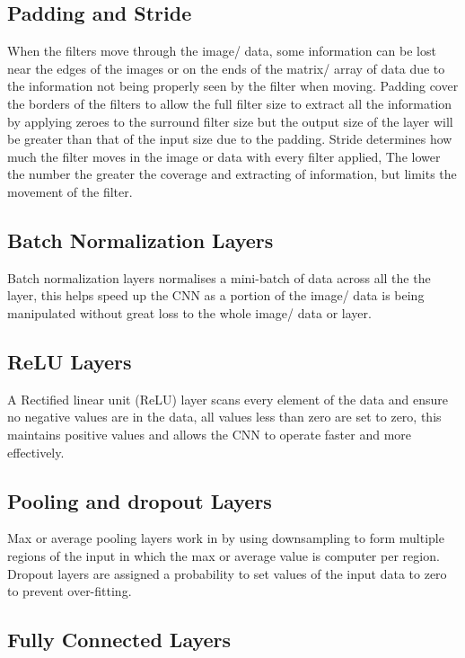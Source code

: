 \subsection{Padding and Stride}

When the filters move through the image/ data, some information can be lost near the edges of the images or on the ends of the matrix/ array of data due to the information not being properly seen by the filter when moving. Padding cover the borders of the filters to allow the full filter size to extract all the information by applying zeroes to the surround filter size but the output size of the layer will be greater than that of the input size due to the padding. Stride determines how much the filter moves in the image or data with every filter applied, The lower the number the greater the coverage and extracting of information, but limits the movement of the filter.

\subsection{Batch Normalization Layers}

Batch normalization layers normalises a mini-batch of data across all the the layer, this helps speed up the CNN as a portion of the image/ data is being manipulated without great loss to the whole image/ data or layer.

\subsection{ReLU Layers}

A Rectified linear unit (ReLU) layer scans every element of the data and ensure no negative values are in the data, all values less than zero are set to zero, this maintains positive values and allows the CNN to operate faster and more effectively.


\subsection{Pooling and dropout Layers}

Max or average pooling layers work in by using downsampling to form multiple regions of the input in which the max or average value is computer per region. Dropout layers are assigned a probability to set values of the input data to zero to prevent over-fitting.

\subsection{Fully Connected Layers}

